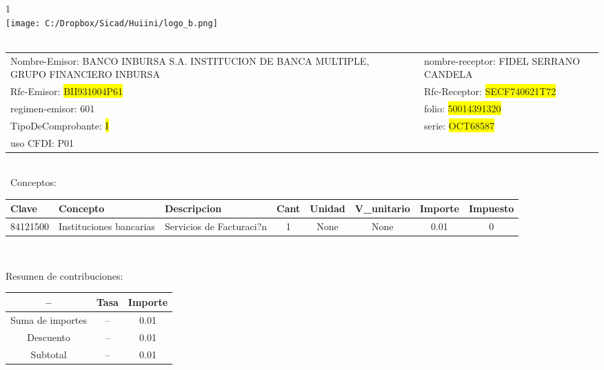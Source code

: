\documentclass{article}
\begin{document}
\hspace{18cm} 1\\
\texttt{[image: C:/Dropbox/Sicad/Huiini/logo\_b.png]}
\bigskip\\\
\begin{tabular}{p{11cm}p{1cm}p{8cm}}

Nombre-Emisor: BANCO INBURSA S.A. INSTITUCION DE BANCA MULTIPLE, GRUPO FINANCIERO INBURSA && nombre-receptor: FIDEL SERRANO CANDELA\\

Rfc-Emisor: \colorbox{yellow}{ BII931004P61 } & & Rfc-Receptor: \colorbox{yellow}{ SECF740621T72 }\\

regimen-emisor: 601 & & folio: \colorbox{yellow}{ 50014391320 }\\

TipoDeComprobante: \colorbox{yellow}{ I } & & serie: \colorbox{yellow}{ OCT68587 }\\

uso CFDI: P01\\



\end{tabular}
\bigskip\bigskip\bigskip\\\
Conceptos:\\
\begin{tabular}{|p{1.5cm}|p{4cm}|p{4cm}|c|c|c|c|c|}
\hline
Clave & Concepto & Descripcion & Cant & Unidad & V_unitario & Importe & Impuesto \\
\hline

84121500 & Instituciones bancarias & Servicios de Facturaci?n & 1 & None & None & 0.01 &  0 \\
\hline

\end{tabular}\\
\bigskip
\begin{center}
Resumen de contribuciones:\\
\bigskip
\begin{tabular}{|c|c|c|}
\hline
 -- & Tasa & Importe\\
\hline

Suma de importes & -- & 0.01 \\
\hline

Descuento & -- & 0.01 \\
\hline

Subtotal  & -- & 0.01 \\
\hline

\end{tabular}
\end{center}
\end{document}
